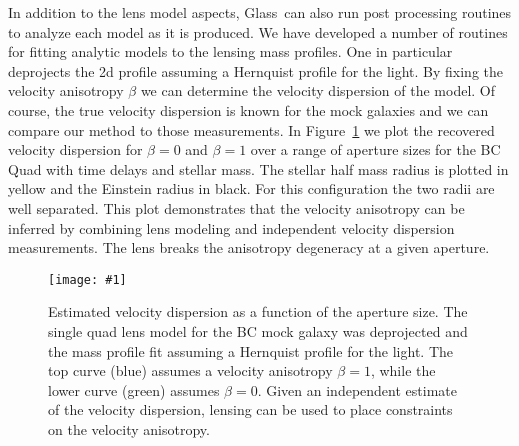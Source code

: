 \documentclass[onecolumn,galley]{mn2e}
\newcommand{\Glass}{{\sc Glass}}
\newcommand{\figref}[1] {Figure~\ref{#1}}
\newcommand\plotone[1]{%
 \centering
 \leavevmode
 \texttt{[image: \#1]}%
}%
\begin{document}
In addition to the lens model aspects, \Glass\ can also run post processing
routines to analyze each model as it is produced. We have developed a number of
routines for fitting analytic models to the lensing mass profiles. One in
particular deprojects the 2d profile assuming a Hernquist profile for the
light. By fixing the velocity anisotropy $\beta$ we can determine the velocity
dispersion of the model. Of course, the true velocity dispersion is known for
the mock galaxies and we can compare our method to those measurements.  In
\figref{sigma-beta} we plot the recovered velocity dispersion for $\beta=0$ and $\beta=1$
over a range of aperture sizes for the BC Quad with time delays and stellar
mass. The stellar half mass radius is plotted in yellow and the Einstein radius
in black. For this configuration the two radii are well separated. This plot
demonstrates that the velocity anisotropy can be inferred by combining lens
modeling and independent velocity dispersion measurements. The lens breaks
the anisotropy degeneracy at a given aperture.

\begin{figure}
\plotone{BCQuadR1a_TmS-sb.pdf}
\caption{Estimated velocity dispersion as a function of the aperture size. The
single quad lens model for the BC mock galaxy was deprojected and the mass
profile fit assuming a Hernquist profile for the light. The top curve (blue)
assumes a velocity anisotropy $\beta=1$, while the lower curve (green)
assumes $\beta=0$. Given an independent estimate of the velocity dispersion,
lensing can be used to place constraints on the velocity anisotropy.}
\label{sigma-beta}
\end{figure}

%
\end{document}
